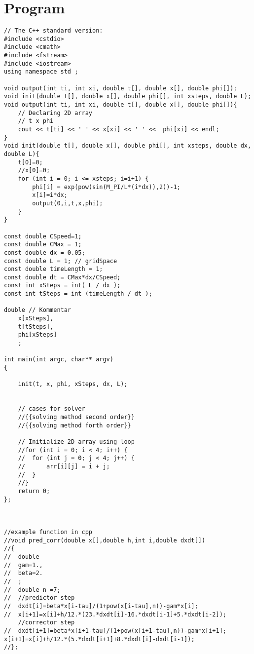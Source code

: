 \documentclass[10pt,fleqn,reqno,a4paper]{article}
\begin{document}
\section{Program}
\begin{verbatim}
// The C++ standard version:
#include <cstdio>
#include <cmath>
#include <fstream>
#include <iostream>
using namespace std ;

void output(int ti, int xi, double t[], double x[], double phi[]);
void init(double t[], double x[], double phi[], int xsteps, double L);
void output(int ti, int xi, double t[], double x[], double phi[]){
    // Declaring 2D array
    // t x phi
    cout << t[ti] << ' ' << x[xi] << ' ' <<  phi[xi] << endl;
}
void init(double t[], double x[], double phi[], int xsteps, double dx, double L){
    t[0]=0;
    //x[0]=0;
    for (int i = 0; i <= xsteps; i=i+1) {
        phi[i] = exp(pow(sin(M_PI/L*(i*dx)),2))-1;
        x[i]=i*dx;
        output(0,i,t,x,phi);
	}
}

const double CSpeed=1;
const double CMax = 1;
const double dx = 0.05;
const double L = 1; // gridSpace
const double timeLength = 1;
const double dt = CMax*dx/CSpeed;
const int xSteps = int( L / dx );
const int tSteps = int (timeLength / dt );

double // Kommentar
    x[xSteps],
    t[tSteps],
    phi[xSteps]
    ;

int main(int argc, char** argv)
{

    init(t, x, phi, xSteps, dx, L);


    // cases for solver
    //{{solving method second order}}
    //{{solving method forth order}}

	// Initialize 2D array using loop
	//for (int i = 0; i < 4; i++) {
	//	for (int j = 0; j < 4; j++) {
	//		arr[i][j] = i + j;
	//	}
	//}
	return 0;
};



//example function in cpp
//void pred_corr(double x[],double h,int i,double dxdt[])
//{
//	double
//	gam=1.,
//	beta=2.
//	;
//	double n =7;
//	//predictor step
//	dxdt[i]=beta*x[i-tau]/(1+pow(x[i-tau],n))-gam*x[i];
//	x[i+1]=x[i]+h/12.*(23.*dxdt[i]-16.*dxdt[i-1]+5.*dxdt[i-2]);
	//corrector step
//	dxdt[i+1]=beta*x[i+1-tau]/(1+pow(x[i+1-tau],n))-gam*x[i+1]; x[i+1]=x[i]+h/12.*(5.*dxdt[i+1]+8.*dxdt[i]-dxdt[i-1]);
//};
\end{verbatim}
\end{document}
